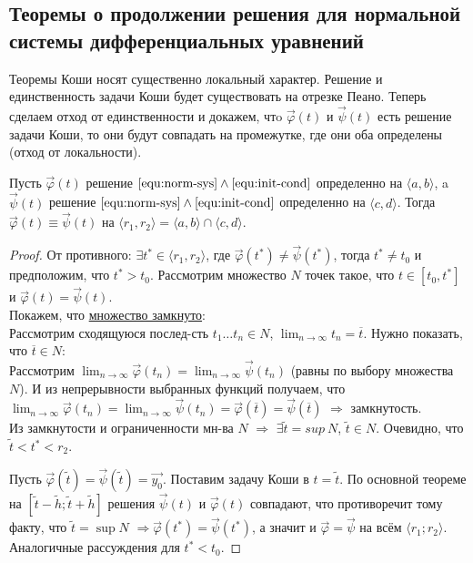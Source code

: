 
\subsection{Теоремы о продолжении решения для нормальной системы дифференциальных уравнений}

Теоремы Коши носят существенно локальный характер. Решение и единственность задачи Коши будет существовать на отрезке Пеано. Теперь сделаем отход от единственности и докажем, чтo $\Vec{\varphi}(t)$ и $\Vec{\psi}(t)$ есть решение задачи Коши, то они будут совпадать на промежутке, где они оба определены (отход от локальности).

\begin{theorem}
	Пусть $\Vec{\varphi}(t)$ решение $\eqref{equ:norm-sys} \wedge \eqref{equ:init-cond}$ определенно на $\langle a, b \rangle$, a  $\Vec{\psi}(t)$ решение $\eqref{equ:norm-sys} \wedge \eqref{equ:init-cond}$ определенно на $\langle c, d \rangle$.
	Тогда $\Vec{\varphi}(t) \equiv \Vec{\psi}(t)$ на $\langle r_1, r_2 \rangle = \langle a, b \rangle \cap \langle c, d \rangle$.
\end{theorem}
\begin{proof}
	От противного: $\exists t^* \in \langle r_1, r_2 \rangle$, где $\Vec{\varphi}(t^*) \neq \Vec{\psi}(t^*)$, тогда $t^* \neq t_0$ и предположим, что $t^* > t_0$. 
	Рассмотрим множество $N$ точек такое, что $t \in [t_0, t^*]$ и $\Vec{\varphi}(t) = \Vec{\psi}(t)$. \\
	Покажем, что \underline{множество замкнуто}: \\
	Рассмотрим сходящуюся послед-сть $t_1 \ldots t_n \in N$, $\displaystyle \lim_{n\to\infty} t_n = \overline{t}$. Нужно показать, что $\overline{t} \in N$:\\
	Рассмотрим $\displaystyle \lim_{n\to\infty} \Vec{\varphi}(t_n) = \lim_{n\to\infty} \Vec{\psi}(t_n)$ (равны по выбору множества $N$). И из непрерывности выбранных функций получаем, что $\displaystyle \lim_{n\to\infty} \Vec{\varphi}(t_n) = \lim_{n\to\infty} \Vec{\psi}(t_n) = \Vec{\varphi}(\overline{t}) = \Vec{\psi}(\overline{t})$ $\Rightarrow$ замкнутость. \\
	Из замкнутости и ограниченности мн-ва $N$ $\Rightarrow$ $\exists \widetilde{t} = sup\ N$, $\widetilde{t} \in N$. Очевидно, что $\widetilde{t} < t^* < r_2$.
	
	Пусть $\Vec{\varphi}(\widetilde{t}) = \Vec{\psi}(\widetilde{t}) = \vec{y_0}.$ Поставим задачу Коши в $t = \widetilde{t}$. По основной теореме на $[\widetilde{t} - \widetilde{h}; \widetilde{t} + \widetilde{h}]$ решения $\vec{\psi}(t)$ и $\vec{\varphi}(t)$ совпадают, что противоречит тому факту, что $\widetilde{t} = \sup N$ $\Rightarrow  \vec{\varphi} (t^*) = \vec{\psi}(t^*)$, а значит и $\vec{\varphi} = \vec{\psi}$ на всём $\langle r_1; r_2\rangle$. Аналогичные рассуждения для $t^* < t_0$. 
\end{proof}


